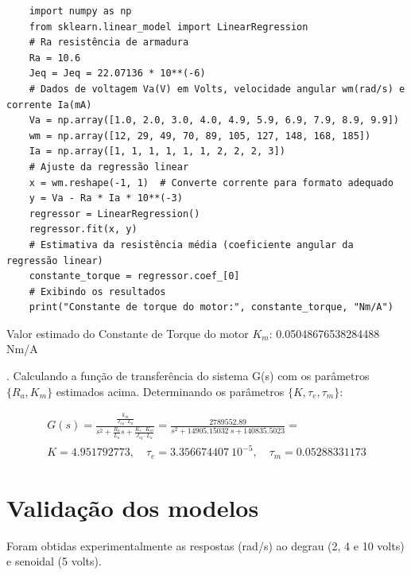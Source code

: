 \documentclass[10pt]{article}
\begin{document}
\begin{verbatim}
    import numpy as np
    from sklearn.linear_model import LinearRegression
    # Ra resistência de armadura
    Ra = 10.6
    Jeq = Jeq = 22.07136 * 10**(-6)
    # Dados de voltagem Va(V) em Volts, velocidade angular wm(rad/s) e corrente Ia(mA)
    Va = np.array([1.0, 2.0, 3.0, 4.0, 4.9, 5.9, 6.9, 7.9, 8.9, 9.9])
    wm = np.array([12, 29, 49, 70, 89, 105, 127, 148, 168, 185])
    Ia = np.array([1, 1, 1, 1, 1, 1, 2, 2, 2, 3])
    # Ajuste da regressão linear
    x = wm.reshape(-1, 1)  # Converte corrente para formato adequado
    y = Va - Ra * Ia * 10**(-3)
    regressor = LinearRegression()
    regressor.fit(x, y)
    # Estimativa da resistência média (coeficiente angular da regressão linear)
    constante_torque = regressor.coef_[0]
    # Exibindo os resultados
    print("Constante de torque do motor:", constante_torque, "Nm/A")
\end{verbatim}

\quad Valor estimado do Constante de Torque do motor $K_m$: 0.05048676538284488 Nm/A

. Calculando a função de transferência do sistema G(s) com os parâmetros $\{ R_a, K_m \}$
estimados acima. Determinando os parâmetros $\{K,\tau_e, \tau_m\}$:

\begin{equation}
\begin{aligned}
    G(s) = \frac{\frac{k_m}{J_{eq} \cdot L_a}}{s^2 + \frac{R_a}{L_a}s + \frac{K_e \cdot K_m}{J_{eq} \cdot L_a}} = \frac{2789552.89}{s^2 + 14905.15032 \ s + 140835.5023} = \\
    K = 4.951792773, \quad \tau_e = 3.356674407 \ 10^{-5}, \quad \tau_m = 0.05288331173 
\end{aligned}
\end{equation}

\section{Validação dos modelos}

\quad Foram obtidas experimentalmente as respostas (rad/s) ao degrau (2, 4 e 10 volts) e
senoidal (5 volts).
\end{document}
